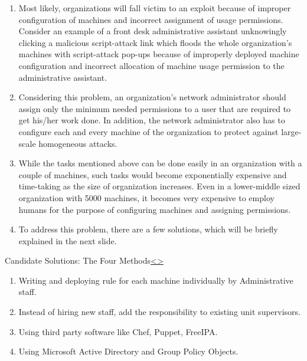 \documentclass[12pt]{extarticle}
\newenvironment{instructionblock}{\Large\bgroup}{\egroup}
\newcommand{\ben}{\begin{enumerate}}
\newcommand{\een}{\end{enumerate}}
\begin{document}
\ben
	\item Most likely, organizations will fall victim to an exploit because of improper configuration of machines and incorrect assignment of usage permissions. Consider an example of a front desk administrative assistant unknowingly clicking a malicious script-attack link which floods the whole organization's machines with script-attack pop-ups because of improperly deployed machine configuration and incorrect allocation of machine usage permission to the administrative assistant.  
	
	\item  Considering this problem, an organization's network administrator should assign only the minimum needed permissions to a user that are required to get his/her work done. In addition, the network administrator also has to configure each and every machine of the organization to protect against large-scale homogeneous attacks.
	
	\item  While the tasks mentioned above can be done easily in an organization with a couple of machines, such tasks would become exponentially expensive and time-taking as the size of organization increases. Even in a lower-middle sized organization with 5000 machines, it becomes very expensive to employ humans for the purpose of configuring machines and assigning permissions.
	
	\item To address this problem, there are a few solutions, which will be briefly explained in the next slide.   
\een




\pagebreak
\begin{slide}{Candidate Solutions: The Four Methods}{\hyperref[slide 4]{\textless}\hyperref[slide 6]{\textgreater}}
\begin{instructionblock}
\begin{enumerate}
\item { Writing and deploying rule for each machine individually by Administrative staff.}
\item { Instead of hiring new staff, add the responsibility to existing unit supervisors.}
\item { Using third party software like Chef, Puppet, FreeIPA.}
\item { Using Microsoft Active Directory and Group Policy Objects.}
\end{enumerate}
\end{instructionblock}
\end{slide}
\end{document}
